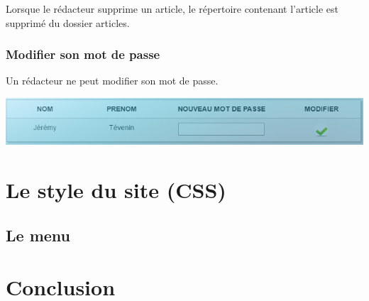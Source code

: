 \documentclass[hidelinks, 12pt,a4paper]{article}
\begin{document}
Lorsque le rédacteur supprime un article, le répertoire contenant l'article est supprimé du dossier articles.

\subsubsection{Modifier son mot de passe}
Un rédacteur ne peut modifier son mot de passe.\\
\begin{center}
\includegraphics[width=16cm]{images/modifauteur.png}\\
\end{center}


\newpage
\section{Le style du site (CSS)}
\subsection{Le menu}

\newpage
\section{Conclusion}
\end{document}
